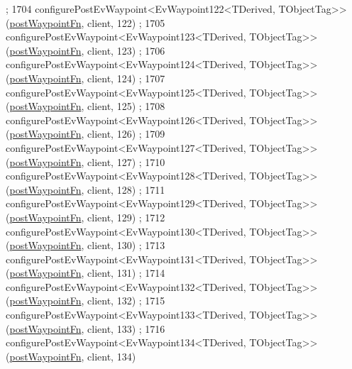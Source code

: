 \begin{DoxyCode}
      ;
1704     configurePostEvWaypoint<EvWaypoint122<TDerived, TObjectTag>>(\hyperlink{classmove__base__z__client_1_1WaypointEventDispatcher_acc538eb7506c13f7cca2268a1742dadd}{postWaypointFn}, client, 122)
      ;
1705     configurePostEvWaypoint<EvWaypoint123<TDerived, TObjectTag>>(\hyperlink{classmove__base__z__client_1_1WaypointEventDispatcher_acc538eb7506c13f7cca2268a1742dadd}{postWaypointFn}, client, 123)
      ;
1706     configurePostEvWaypoint<EvWaypoint124<TDerived, TObjectTag>>(\hyperlink{classmove__base__z__client_1_1WaypointEventDispatcher_acc538eb7506c13f7cca2268a1742dadd}{postWaypointFn}, client, 124)
      ;
1707     configurePostEvWaypoint<EvWaypoint125<TDerived, TObjectTag>>(\hyperlink{classmove__base__z__client_1_1WaypointEventDispatcher_acc538eb7506c13f7cca2268a1742dadd}{postWaypointFn}, client, 125)
      ;
1708     configurePostEvWaypoint<EvWaypoint126<TDerived, TObjectTag>>(\hyperlink{classmove__base__z__client_1_1WaypointEventDispatcher_acc538eb7506c13f7cca2268a1742dadd}{postWaypointFn}, client, 126)
      ;
1709     configurePostEvWaypoint<EvWaypoint127<TDerived, TObjectTag>>(\hyperlink{classmove__base__z__client_1_1WaypointEventDispatcher_acc538eb7506c13f7cca2268a1742dadd}{postWaypointFn}, client, 127)
      ;
1710     configurePostEvWaypoint<EvWaypoint128<TDerived, TObjectTag>>(\hyperlink{classmove__base__z__client_1_1WaypointEventDispatcher_acc538eb7506c13f7cca2268a1742dadd}{postWaypointFn}, client, 128)
      ;
1711     configurePostEvWaypoint<EvWaypoint129<TDerived, TObjectTag>>(\hyperlink{classmove__base__z__client_1_1WaypointEventDispatcher_acc538eb7506c13f7cca2268a1742dadd}{postWaypointFn}, client, 129)
      ;
1712     configurePostEvWaypoint<EvWaypoint130<TDerived, TObjectTag>>(\hyperlink{classmove__base__z__client_1_1WaypointEventDispatcher_acc538eb7506c13f7cca2268a1742dadd}{postWaypointFn}, client, 130)
      ;
1713     configurePostEvWaypoint<EvWaypoint131<TDerived, TObjectTag>>(\hyperlink{classmove__base__z__client_1_1WaypointEventDispatcher_acc538eb7506c13f7cca2268a1742dadd}{postWaypointFn}, client, 131)
      ;
1714     configurePostEvWaypoint<EvWaypoint132<TDerived, TObjectTag>>(\hyperlink{classmove__base__z__client_1_1WaypointEventDispatcher_acc538eb7506c13f7cca2268a1742dadd}{postWaypointFn}, client, 132)
      ;
1715     configurePostEvWaypoint<EvWaypoint133<TDerived, TObjectTag>>(\hyperlink{classmove__base__z__client_1_1WaypointEventDispatcher_acc538eb7506c13f7cca2268a1742dadd}{postWaypointFn}, client, 133)
      ;
1716     configurePostEvWaypoint<EvWaypoint134<TDerived, TObjectTag>>(\hyperlink{classmove__base__z__client_1_1WaypointEventDispatcher_acc538eb7506c13f7cca2268a1742dadd}{postWaypointFn}, client, 134)

\end{DoxyCode}
